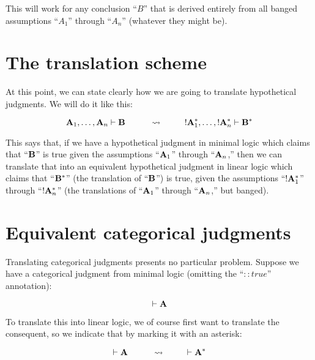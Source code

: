 \documentclass[../../../main.tex]{subfiles}
\begin{document}
\noindent
This will work for any conclusion ``$B$'' that is derived entirely from all banged assumptions ``$A_{1}$'' through ``$A_{n}$'' (whatever they might be).


\section{The translation scheme}

At this point, we can state clearly how we are going to translate hypothetical judgments. We will do it like this:

\begin{equation*}
  \nd{A}_{1}, \ldots, \nd{A}_{n} \ndturnstile/ \nd{B}
  \hskip 1cm \rightsquigarrow \hskip 1cm
  \bang/\nd{A}_{1}^{*}, \ldots, \bang/\nd{A}_{n}^{*} \ndturnstile/ \nd{B}^{*}
\end{equation*}

\noindent
This says that, if we have a hypothetical judgment in minimal logic which claims that ``$\mathbf{B}$'' is true given the assumptions ``$\mathbf{A}_{1}$'' through ``$\mathbf{A}_{n}$,'' then we can translate that into an equivalent hypothetical judgment in linear logic which claims that ``$\mathbf{B}^{*}$'' (the translation of ``$\mathbf{B}$'') is true, given the assumptions ``$\bang/\nd{A}_{1}^{*}$'' through ``$\bang/\nd{A}_{n}^{*}$'' (the translations of ``$\mathbf{A}_{1}$'' through ``$\mathbf{A}_{n}$,'' but banged). 


\section{Equivalent categorical judgments}

Translating categorical judgments presents no particular problem. Suppose we have a categorical judgment from minimal logic (omitting the ``$:: true$'' annotation):

\begin{equation*}
  \ndturnstile/ \nd{A}
\end{equation*}

\noindent
To translate this into linear logic, we of course first want to translate the consequent, so we indicate that by marking it with an asterisk:

\begin{equation*}
  \ndturnstile/ \nd{A} \hskip 1cm \rightsquigarrow \hskip 1cm \ndturnstile/ \nd{A}^{*}
\end{equation*}
\end{document}
